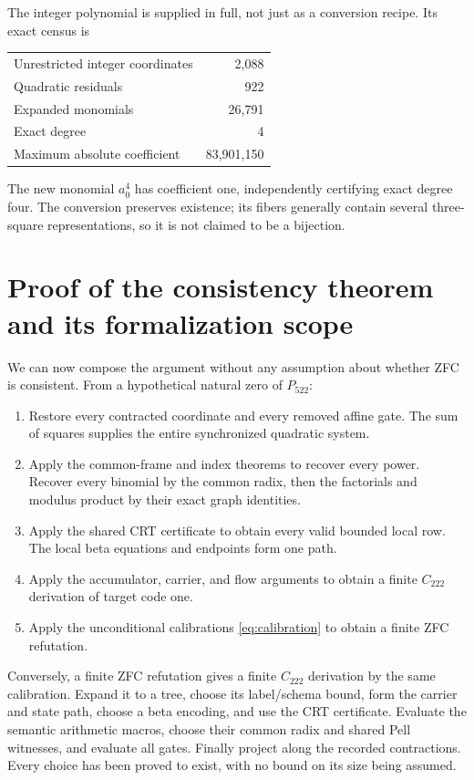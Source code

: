 \documentclass[11pt,letterpaper]{article}
\theoremstyle{definition}\newtheorem{definition}[theorem]{Definition}
\theoremstyle{remark}\newtheorem{remark}[theorem]{Remark}
\newcommand{\pn}{P_{522}}
\begin{document}
The integer polynomial is supplied in full, not just as a conversion
recipe. Its exact census is
\begin{center}
\begin{tabular}{lr}
\toprule
Unrestricted integer coordinates & 2,088\\
Quadratic residuals & 922\\
Expanded monomials & 26,791\\
Exact degree & 4\\
Maximum absolute coefficient & 83,901,150\\
\bottomrule
\end{tabular}
\end{center}
The new monomial $a_0^4$ has coefficient one, independently certifying
exact degree four. The conversion preserves existence; its fibers
generally contain several three-square representations, so it is not
claimed to be a bijection.

\section{Proof of the consistency theorem and its formalization scope}
\label{sec:scope}

We can now compose the argument without any assumption about whether
ZFC is consistent. From a hypothetical natural zero of $\pn$:
\begin{enumerate}
\item Restore every contracted coordinate and every removed affine gate.
      The sum of squares supplies the entire synchronized quadratic system.
\item Apply the common-frame and index theorems to recover every power.
      Recover every binomial by the common radix, then the factorials and
      modulus product by their exact graph identities.
\item Apply the shared CRT certificate to obtain every valid bounded
      local row. The local beta equations and endpoints form one path.
\item Apply the accumulator, carrier, and flow arguments to obtain a
      finite $C_{222}$ derivation of target code one.
\item Apply the unconditional calibrations \eqref{eq:calibration} to
      obtain a finite ZFC refutation.
\end{enumerate}
Conversely, a finite ZFC refutation gives a finite $C_{222}$ derivation
by the same calibration. Expand it to a tree, choose its label/schema
bound, form the carrier and state path, choose a beta encoding, and use
the CRT certificate. Evaluate the semantic arithmetic macros, choose
their common radix and shared Pell witnesses, and evaluate all gates.
Finally project along the recorded contractions. Every choice has been
proved to exist, with no bound on its size being assumed.
\end{document}
